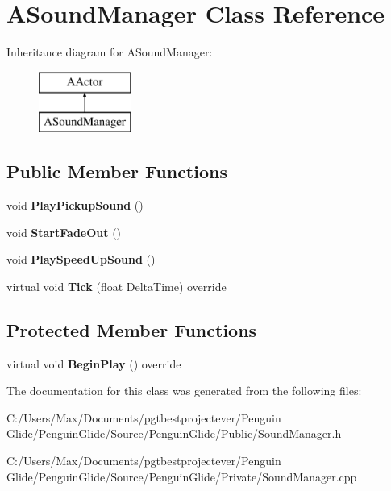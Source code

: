 \hypertarget{class_a_sound_manager}{}\section{A\+Sound\+Manager Class Reference}
\label{class_a_sound_manager}
Inheritance diagram for A\+Sound\+Manager\+:\begin{figure}[H]
\begin{center}
\leavevmode
\includegraphics[height=2.000000cm]{class_a_sound_manager}
\end{center}
\end{figure}
\subsection*{Public Member Functions}
\begin{DoxyCompactItemize}
\item 
\mbox{\label{class_a_sound_manager_ac59f959ca1ec25d5bf8f70760a7a3969}} 
void {\bfseries Play\+Pickup\+Sound} ()
\item 
\mbox{\label{class_a_sound_manager_adda6fea6d9eb0925ba9b4d52af267b97}} 
void {\bfseries Start\+Fade\+Out} ()
\item 
\mbox{\label{class_a_sound_manager_a296959eeb11d6eaca5f91bb3fae58bb5}} 
void {\bfseries Play\+Speed\+Up\+Sound} ()
\item 
\mbox{\label{class_a_sound_manager_a09d5e9d7bf16a024fe7a8cb175709733}} 
virtual void {\bfseries Tick} (float Delta\+Time) override
\end{DoxyCompactItemize}
\subsection*{Protected Member Functions}
\begin{DoxyCompactItemize}
\item 
\mbox{\label{class_a_sound_manager_ab91f90dafc9ff9664c13e256668e76ee}} 
virtual void {\bfseries Begin\+Play} () override
\end{DoxyCompactItemize}


The documentation for this class was generated from the following files\+:\begin{DoxyCompactItemize}
\item 
C\+:/\+Users/\+Max/\+Documents/pgtbestprojectever/\+Penguin Glide/\+Penguin\+Glide/\+Source/\+Penguin\+Glide/\+Public/Sound\+Manager.\+h\item 
C\+:/\+Users/\+Max/\+Documents/pgtbestprojectever/\+Penguin Glide/\+Penguin\+Glide/\+Source/\+Penguin\+Glide/\+Private/Sound\+Manager.\+cpp\end{DoxyCompactItemize}

